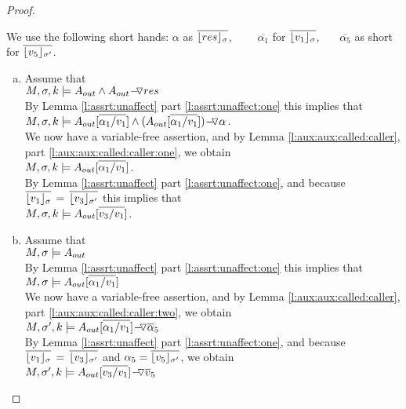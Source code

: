 \begin{proof}$ ~ $

We use the following short hands: $\alpha$ as   $\overline {\interpret {\sigma} {res}}$, 
\ \ \ \ 
$\overline {\alpha_1}$   for $\overline {\interpret {\sigma} {v_1}}$, \ \ \ 
$\overline {\alpha_5}$ as short for $\overline {\interpret {\sigma'} {v_5}}$.

\newcommand{\substOne}{[\overline{\alpha_1/v_1}]}
\newcommand{\substFive}{[\overline{\alpha_5/v_5}]}

\begin{enumerate}[a.]
\item
Assume that \\
$\satDAssertFrom M  \sigma k   {\Aout  \wedge  {\PushASLong  {res} {\Aout} } } $\\
	By Lemma \ref{l:assrt:unaffect} part \ref{l:assrt:unaffect:one} this  implies that \\
$ \satDAssertFrom M  \sigma k   {\Aout\substOne  \wedge  {\PushASLong  {\alpha} {(\Aout\substOne)} } }$.\\
We now have a variable-free assertion,
and by Lemma \ref{l:aux:aux:called:caller}, part \ref{l:aux:aux:called:caller:one}, we obtain\\
$ \satDAssertFrom M  \sigma k   {\Aout\substOne} $.\\
By Lemma \ref{l:assrt:unaffect} part \ref{l:assrt:unaffect:one}, and because $ \overline {\interpret {\sigma} {v_1} }\, =\,  \overline {\interpret {\sigma'}  {v_3} }$  this  implies that \\
$ \satDAssertFrom M  \sigma k   {\Aout[\overline { v_3/v_1}] } $.
\item
Assume that \\
$M,  \sigma\models \Aout  $\\
By Lemma \ref{l:assrt:unaffect} part \ref{l:assrt:unaffect:one} this  implies that \\
$M,  \sigma\models \Aout\substOne$\\
We now have a variable-free assertion,
and by Lemma \ref{l:aux:aux:called:caller}, part \ref{l:aux:aux:called:caller:two}, we obtain\\
$ \satDAssertFrom M  {\sigma'} k    {\PushASLong {\overline \alpha_5} {\Aout\substOne}}$\\
By Lemma \ref{l:assrt:unaffect} part \ref{l:assrt:unaffect:one}, and because $ \overline {\interpret {\sigma} {v_1} }\, =\,  \overline {\interpret {\sigma'}  {v_3} }$  and $\alpha_5 = \overline {\interpret {\sigma'} {v_5}}$, we obtain \\
$ \satDAssertFrom M  {\sigma'} k    {\PushASLong {\overline v_5} {\Aout[\overline {v_3/v_1}]}}$
\end{enumerate}

\end{proof}



